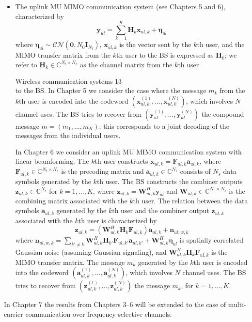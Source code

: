 \documentclass[11pt,a4paper]{report}
\begin{document}
\begin{itemize}
    \item The uplink MU MIMO communication system (see Chapters 5 and 6), characterized by
    \begin{equation*}
        \mathbf{y}_{ul} = \sum_{k=1}^K \mathbf{H}_k \mathbf{x}_{ul,k} + \boldsymbol{\eta}_{ul}
    \end{equation*}
    where $\boldsymbol{\eta}_{ul} \sim \mathcal{CN}(\mathbf{0}, N_0 \mathbf{I}_{N_t})$, $\mathbf{x}_{ul,k}$ is the vector sent by the $k$th user, and the MIMO transfer matrix from the $k$th user to the BS is expressed as $\mathbf{H}_k$; we refer to $\mathbf{H}_k \in \mathbb{C}^{N_t \times N_r}$ as the channel matrix from the $k$th user

\newpage
 Wireless communication systems \hfill 13 \\

    \noindent to the BS. In Chapter 5 we consider the case where the message $m_k$ from the $k$th user is encoded into the codeword $(\mathbf{x}_{ul,k}^{(1)}, \dots, \mathbf{x}_{ul,k}^{(N)})$, which involves $N$ channel uses. The BS tries to recover from $(\mathbf{y}_{ul}^{(1)}, \dots, \mathbf{y}_{ul}^{(N)})$ the compound message $m = (m_1, \dots, m_K)$; this corresponds to a joint decoding of the messages from the individual users.

    In Chapter 6 we consider an uplink MU MIMO communication system with linear beamforming. The $k$th user constructs $\mathbf{x}_{ul,k} = \mathbf{F}_{ul,k} \mathbf{a}_{ul,k}$, where $\mathbf{F}_{ul,k} \in \mathbb{C}^{N_t \times N_s}$ is the precoding matrix and $\mathbf{a}_{ul,k} \in \mathbb{C}^{N_s}$ consists of $N_s$ data symbols generated by the $k$th user. The BS constructs the combiner outputs $\mathbf{z}_{ul,k} \in \mathbb{C}^{N_s}$ for $k = 1, \dots, K$, where $\mathbf{z}_{ul,k} = \mathbf{W}_{ul,k}^H \mathbf{y}_{ul}$ and $\mathbf{W}_{ul,k} \in \mathbb{C}^{N_r \times N_s}$ is the combining matrix associated with the $k$th user. The relation between the data symbols $\mathbf{a}_{ul,k}$ generated by the $k$th user and the combiner output $\mathbf{z}_{ul,k}$ associated with the $k$th user is characterized by
    \begin{equation*}
        \mathbf{z}_{ul,k} = (\mathbf{W}_{ul,k}^H \mathbf{H}_k \mathbf{F}_{ul,k})\mathbf{a}_{ul,k} + \mathbf{n}_{ul,w,k}
    \end{equation*}
    where $\mathbf{n}_{ul,w,k} = \sum_{k' \neq k} \mathbf{W}_{ul,k}^H \mathbf{H}_{k'} \mathbf{F}_{ul,k'} \mathbf{a}_{ul,k'} + \mathbf{W}_{ul,k}^H \boldsymbol{\eta}_{ul}$ is spatially correlated Gaussian noise (assuming Gaussian signaling), and $\mathbf{W}_{ul,k}^H \mathbf{H}_k \mathbf{F}_{ul,k}$ is the MIMO transfer matrix. The message $m_k$ generated by the $k$th user is encoded into the codeword $(\mathbf{a}_{ul,k}^{(1)}, \dots, \mathbf{a}_{ul,k}^{(N)})$, which involves $N$ channel uses. The BS tries to recover from $(\mathbf{z}_{ul,k}^{(1)}, \dots, \mathbf{z}_{ul,k}^{(N)})$ the message $m_k$, for $k = 1, \dots, K$.
\end{itemize}

In Chapter 7 the results from Chapters 3--6 will be extended to the case of multi-carrier communication over frequency-selective channels.
\end{document}
